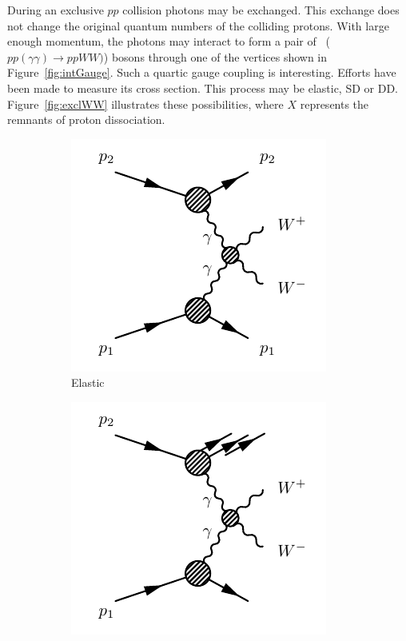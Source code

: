 \par During an exclusive $pp$ collision photons may be exchanged. This exchange does not change 
the original quantum numbers of the colliding protons. With large enough momentum, the photons may 
interact to form a pair of \Wpm\ ($pp(\gamma\gamma)\to ppWW)$) bosons through one of the vertices shown in Figure~\ref{fig:intGauge}. 
Such a quartic gauge coupling is interesting. Efforts have been made to measure its cross section. 
This process may be elastic, SD or DD. Figure~\ref{fig:exclWW} illustrates these possibilities, where 
$X$ represents the remnants of proton dissociation.      

\begin{figure}[!h]
\begin{subfigure}{0.33\textwidth}
   \includegraphics[width=\textwidth]{figures/exclWW.pdf}
\caption{Elastic}
\end{subfigure} %
\begin{subfigure}{0.33\textwidth}
   \includegraphics[width=\textwidth]{figures/exclWWsd.pdf}

\end{subfigure}
\end{figure}
